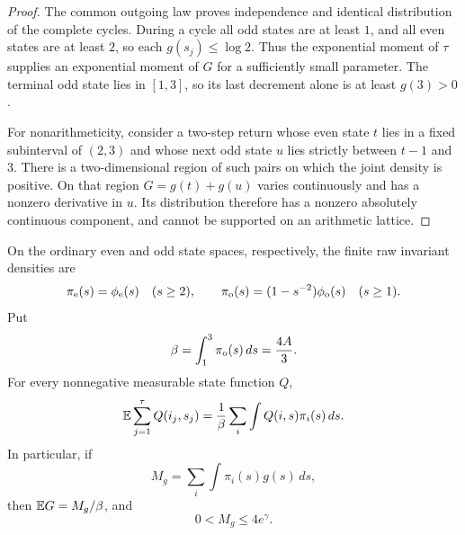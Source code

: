 \begin{proof}
The common outgoing law proves independence and identical
distribution of the complete cycles.  During a cycle all odd
states are at least \(1\), and all even states are at least \(2\),
so each \(g(s_j)\le\log2\).
Thus the exponential moment of \(\tau\) supplies an exponential
moment of \(G\) for a sufficiently small parameter.
The terminal odd state lies in \([1,3]\), so its last decrement
alone is at least \(g(3)>0\).

For nonarithmeticity, consider a two-step return whose even state
\(t\) lies in a fixed subinterval of \((2,3)\) and whose next odd
state \(u\) lies strictly between \(t-1\) and \(3\).
There is a two-dimensional region of such pairs on which the
joint density is positive.  On that region
\(G=g(t)+g(u)\) varies continuously and has a nonzero derivative
in \(u\).  Its distribution therefore has a nonzero absolutely
continuous component, and cannot be supported on an arithmetic
lattice.
\end{proof}

\begin{lemma}
\label{lem:invariant}
On the ordinary even and odd state spaces, respectively, the finite
raw invariant densities are
\begin{equation}\label{eq:functions-invariant-densities}
 \pi_\mathrm e(s)=\phi_\mathrm e(s)\quad(s\ge2),\qquad
 \pi_\mathrm o(s)=(1-s^{-2})\phi_\mathrm o(s)\quad(s\ge1).
\end{equation}
Put
\[
 \beta=\int_1^3\pi_\mathrm o(s)\,ds=\frac{4A}{3}.
\]
For every nonnegative measurable state function \(Q\),
\begin{equation}\label{eq:functions-cycle-occupation}
 \mathbb E\sum_{j=1}^{\tau}Q(i_j,s_j)
 =\frac1\beta\sum_i\int Q(i,s)\pi_i(s)\,ds.
\end{equation}
In particular, if
\[
 M_g=\sum_i\int\pi_i(s)g(s)\,ds,
\]
then \(\mathbb E G=M_g/\beta\), and
\begin{equation}\label{eq:mg-bound}
 0<M_g\le4e^\gamma.
\end{equation}
\end{lemma}

